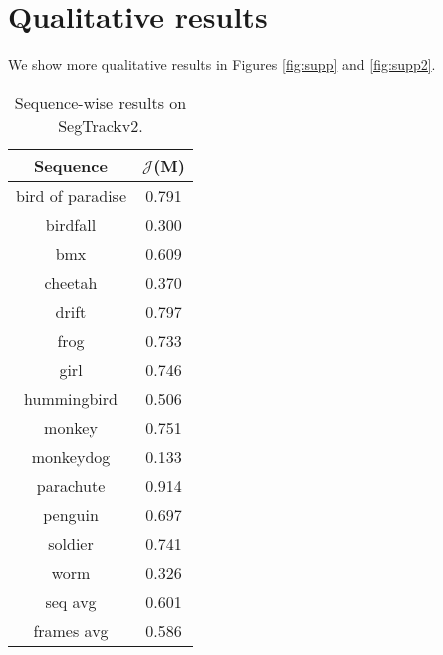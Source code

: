 \section{Qualitative results}
We show more qualitative results in Figures \ref{fig:supp} and \ref{fig:supp2}.


\begin{table}[!htb]
\centering
\footnotesize
\begin{tabular}{c|c}

Sequence&$\mathcal{J}$(M)\\ \hline
bird of paradise & 0.791 \\ 
birdfall & 0.300 \\ 
bmx & 0.609 \\ 
cheetah & 0.370 \\ 
drift & 0.797 \\ 
frog & 0.733 \\ 
girl & 0.746 \\ 
hummingbird & 0.506 \\ 
monkey & 0.751 \\ 
monkeydog & 0.133 \\ 
parachute & 0.914 \\ 
penguin & 0.697 \\ 
soldier & 0.741 \\ 
worm & 0.326 \\ \hline
seq avg & 0.601 \\ 
frames avg & 0.586 \\ 
\end{tabular}
\caption{Sequence-wise results on SegTrackv2.}
\label{tab:stv2}
\end{table}

